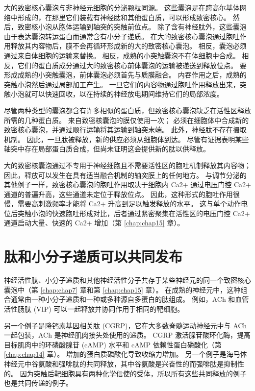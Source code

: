 大的致密核心囊泡与非神经元细胞的分泌颗粒同源。 
这些囊泡是在跨高尔基体网络中形成的，在那里它们装载有神经肽和其他蛋白质，可以形成致密核心。 
然后，致密核小泡从胞体运输到轴突的突触前位点。 
除了含有神经肽外，这些囊泡由于表达囊泡转运蛋白而通常含有小分子递质。 
在大的致密核心囊泡通过胞吐作用释放其内容物后，膜不会再循环形成新的大的致密核心囊泡。 
相反，囊泡必须通过来自体细胞的运输来替换。 
相反，成熟的小突触囊泡不在体细胞中合成。 
相反，它们的蛋白质成分通过大的致密核心前体囊泡的运输被递送到释放位点。 
要形成成熟的小突触囊泡，前体囊泡必须首先与质膜融合。 
内吞作用之后，成熟的突触小泡然后通过局部加工产生。 
一旦它们的内容物通过胞吐作用释放出来，突触小泡就可以快速回收，以在持续的神经放电期间维持它们的局部浓度。


尽管两种类型的囊泡都含有许多相似的蛋白质，但致密核心囊泡缺乏在活性区释放所需的几种蛋白质。 
来自致密核囊泡的膜仅使用一次； 必须在细胞体中合成新的致密核心囊泡，并通过顺行运输将其运输到轴突末端。 
此外，神经肽不存在摄取机制。 
因此，一旦肽被释放，新的供应必须从细胞体到达。 
尽管有证据表明某些轴突中存在局部蛋白质合成，但尚未证明这会提供新的肽以供释放。


大的致密核囊泡通过不专用于神经细胞且不需要活性区的胞吐机制释放其内容物； 因此，释放可以发生在具有适当融合机制的轴突膜上的任何地方。 
与调节分泌的其他例子一样，致密核心囊泡的胞吐作用取决于细胞内 Ca2+ 通过电压门控 Ca2+ 通道的普遍升高，这些通道未定位于释放位点。 
因此，这种形式的胞吐作用很慢，需要高刺激频率才能将 Ca2+ 升高到足以触发释放的水平。 
这与单个动作电位后突触小泡的快速胞吐形成对比，后者通过紧密聚集在活性区的电压门控 Ca2+ 通道启动大量、快速的 Ca2+ 增加（第 \ref{chap:chap15} 章）。



\section{肽和小分子递质可以共同发布}

神经活性肽、小分子递质和其他神经活性分子共存于某些神经元的同一个致密核心囊泡中（第 \ref{chap:chap7} 章和第 \ref{chap:chap15} 章）。 
在成熟的神经元中，这种组合通常由一种小分子递质和一种或多种源自多蛋白的肽组成。 
例如，ACh 和血管活性肠肽 (VIP) 可以一起释放并协同作用于相同的靶细胞。


另一个例子是降钙素基因相关肽 (CGRP)，它在大多数脊髓运动神经元中与 ACh 一起包装，ACh 是神经肌肉接头处使用的递质。 
CGRP 激活腺苷酸环化酶，提高目标肌肉中的环磷酸腺苷 (cAMP) 水平和 cAMP 依赖性蛋白磷酸化（第 \ref{chap:chap14} 章）。 
增加的蛋白质磷酸化导致收缩力增加。 
另一个例子是海马体神经元中谷氨酸和强啡肽的共同释放，其中谷氨酸是兴奋性的而强啡肽是抑制性的。 
因为突触后靶细胞具有两种化学信使的受体，所以所有这些共同释放的例子也是共同传递的例子。


